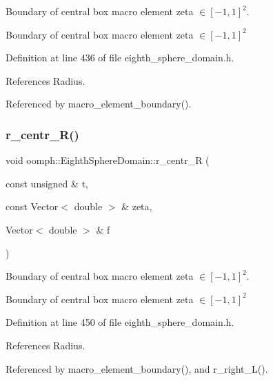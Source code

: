 Boundary of central box macro element zeta $ \in [-1,1]^2 $. 

Boundary of central box macro element zeta $ \in [-1,1]^2 $ 

Definition at line 436 of file eighth\+\_\+sphere\+\_\+domain.\+h.



References Radius.



Referenced by macro\+\_\+element\+\_\+boundary().

\mbox{\label{classoomph_1_1EighthSphereDomain_a226c7c3bbcc59aa73c1033af523ef653}} 
\subsubsection{\texorpdfstring{r\+\_\+centr\+\_\+\+R()}{r\_centr\_R()}}
{\footnotesize\ttfamily void oomph\+::\+Eighth\+Sphere\+Domain\+::r\+\_\+centr\+\_\+R (\begin{DoxyParamCaption}\item[{const unsigned \&}]{t,  }\item[{const Vector$<$ double $>$ \&}]{zeta,  }\item[{Vector$<$ double $>$ \&}]{f }\end{DoxyParamCaption})\hspace{0.3cm}{\ttfamily [private]}}



Boundary of central box macro element zeta $ \in [-1,1]^2 $. 

Boundary of central box macro element zeta $ \in [-1,1]^2 $ 

Definition at line 450 of file eighth\+\_\+sphere\+\_\+domain.\+h.



References Radius.



Referenced by macro\+\_\+element\+\_\+boundary(), and r\+\_\+right\+\_\+\+L().

\mbox{\label{classoomph_1_1EighthSphereDomain_afda0d6220482758cc0ad81ea848de45b}} 
